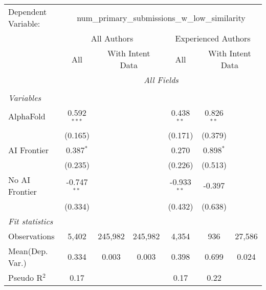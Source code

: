 \begingroup
\centering
\begin{tabular}{lcccccc}
   \tabularnewline \midrule \midrule
   Dependent Variable: & \multicolumn{6}{c}{num\_primary\_submissions\_w\_low\_similarity}\\
 & \multicolumn{3}{c}{All Authors} & \multicolumn{3}{c}{Experienced Authors} \\
\cmidrule(lr){2-4} \cmidrule(lr){5-7}
 & \multicolumn{1}{c}{All} & \multicolumn{2}{c}{With Intent Data} & \multicolumn{1}{c}{All} & \multicolumn{2}{c}{With Intent Data} \\
\cmidrule(lr){2-2} \cmidrule(lr){3-4} \cmidrule(lr){5-5} \cmidrule(lr){6-7}
 & \multicolumn{6}{c}{\textit{All Fields}} \\ \\
   \emph{Variables}\\
   AlphaFold      & 0.592$^{***}$ &         &         & 0.438$^{**}$  & 0.826$^{**}$ &   \\   
                  & (0.165)       &         &         & (0.171)       & (0.379)      &   \\   
   AI Frontier    & 0.387$^{*}$   &         &         & 0.270         & 0.898$^{*}$  &   \\   
                  & (0.235)       &         &         & (0.226)       & (0.513)      &   \\   
   No AI Frontier & -0.747$^{**}$ &         &         & -0.933$^{**}$ & -0.397       &   \\   
                  & (0.334)       &         &         & (0.432)       & (0.638)      &   \\   
   \midrule
   \emph{Fit statistics}\\
   Observations   & 5,402         & 245,982 & 245,982 & 4,354         & 936          & 27,586\\  
Mean(Dep. Var.) & 0.334 & 0.003 & 0.003 & 0.398 & 0.699 & 0.024 \\
   Pseudo R$^2$   & 0.17          &         &         & 0.17          & 0.22         & \\  
   

\end{tabular}
